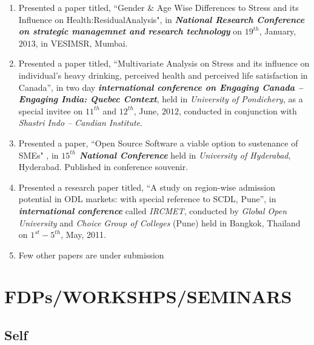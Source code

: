 \documentclass[10pt]{article}
\begin{document}
\begin{enumerate}
\item Presented a paper titled, ``Gender & Age Wise Differences to Stress and its Influence on Health:ResidualAnalysis", in \textit{\textbf{National Research Conference on strategic managemnet and research technology}} on $19^{th}$, January, $2013$, in VESIMSR, Mumbai. 

\item Presented a paper titled, ``Multivariate Analysis on Stress and its influence on individual’s heavy drinking, perceived health and perceived life satisfaction in Canada”, in two day \textit{\textbf{international conference on Engaging Canada – Engaging India: Quebec Context}}, held in  \textit{University of Pondichery}, as a special invitee on $11^{th}$ and $12^{th}$, June, $2012$, conducted in conjunction with \textit{Shastri Indo – Candian Institute}.

\item Presented a paper, ``Open Source Software a viable option to sustenance of SMEs" , in \textit{\textbf{$15^{th}$ National Conference}} held in \textit{University of Hyderabad}, Hyderabad. Published in conference souvenir.

\item Presented a research paper titled, ``A study on region-wise admission potential in ODL markets: with special reference to SCDL, Pune'', in \textit{\textbf{international conference}} called \textit{IRCMET}, conducted by \textit{Global Open University} and \textit{Choice Group of Colleges} (Pune) held in  Bangkok, Thailand on $1^{st}- 5^{th}$, May, 2011. 

\item Few other papers are under submission

\end{enumerate} 


\section{FDPs/WORKSHPS/SEMINARS} \hline \vspace{0.5cm}

\subsection{Self}
\end{document}
